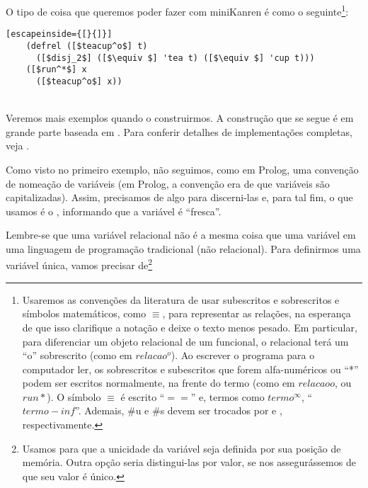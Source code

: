 \documentclass{article}
\begin{document}
  O tipo de coisa que queremos poder fazer com miniKanren é como o
  seguinte\footnote{Usaremos as convenções da literatura de usar
    subescritos e sobrescritos e símbolos matemáticos, como $\equiv $, para
    representar as relações, na esperança de que isso clarifique a
    notação e deixe o texto menos pesado. Em particular, para
    diferenciar um objeto relacional de um funcional, o relacional
    terá um ``o'' sobrescrito (como em $relacao^o$). Ao escrever o
    programa para o computador ler, os sobrescritos e subescritos que
    forem alfa-numéricos ou ``*'' podem ser escritos normalmente, na
    frente do termo (como em $relacaoo$, ou $run*$). O símbolo $\equiv$ é
    escrito ``$==$'' e, termos como $termo^\infty$,
    ``$termo-inf$''. Ademais, \#u e \#s devem ser trocados por
     e , respectivamente.}:
  \\

  \begin{lstlisting}[escapeinside={[}{]}]
    (defrel ([$teacup^o$] t)
      ([$disj_2$] ([$\equiv $] 'tea t) ([$\equiv $] 'cup t)))
    ([$run^*$] x
      ([$teacup^o$] x))
  \end{lstlisting}
  \hspace{1cm} \seta\ \\



  Veremos mais exemplos quando o construirmos. A construção que se segue
  é em grande parte baseada em \cite{will}. Para conferir detalhes de
  implementações completas, veja \cite{kanren}.

  Como visto no primeiro exemplo, não seguimos, como em Prolog, uma
  convenção de nomeação de variáveis (em Prolog, a convenção era de
  que variáveis são  capitalizadas). Assim, precisamos de algo para
  discerni-las e, para tal fim, o que usamos é o ,
  informando que a variável é ``fresca''.
  
  Lembre-se que uma variável relacional não é a mesma
  coisa que uma variável em uma linguagem de programação tradicional
  (não relacional). Para definirmos uma variável única, vamos precisar
  de\footnote{Usamos  para que a unicidade da
    variável seja definida por sua posição de memória. Outra opção
    seria distingui-las por valor, se nos assegurássemos de que seu valor
    é único.}
  
\end{document}
